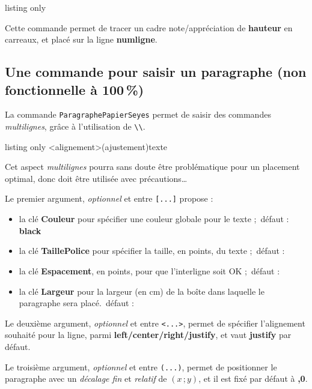 \documentclass[a4paper]{article}
\newcommand\Cle[1]{{\bfseries\sffamily\textlangle #1\textrangle}}
\begin{document}
\begin{PresentationCode}{listing only}
\end{PresentationCode}

Cette commande permet de tracer un cadre \textsf{note/appréciation} de \Cle{hauteur} en carreaux, et placé sur la ligne \Cle{numligne}.

\pagebreak

\subsection{Une commande pour saisir un paragraphe (non fonctionnelle à 100\,\%)}

La commande \texttt{ParagraphePapierSeyes} permet de saisir des commandes \textit{multilignes}, grâce à l'utilisation de \texttt{\textbackslash\textbackslash}.

\begin{PresentationCode}{listing only}
\ParagraphePapierSeyes[options]<alignement>(ajustement){texte}
\end{PresentationCode}

\faBomb{} Cet aspect \textit{multilignes} pourra sans doute être problématique pour un placement optimal, donc doit être utilisée avec précautions\ldots

\smallskip

Le premier argument, \textit{optionnel} et entre \texttt{[...]} propose :

\begin{itemize}
	\item la clé \Cle{Couleur} pour spécifier une couleur globale pour le texte ;\hfill~défaut : \Cle{black}
	\item la clé \Cle{TaillePolice} pour spécifier la taille, en points, du texte ;\hfill~défaut : \Cle{1}
	\item la clé \Cle{Espacement}, en points, pour que l'interligne soit OK ;\hfill~défaut : \Cle{22.792}
	\item la clé \Cle{Largeur} pour la largeur (en cm) de la boîte dans laquelle le paragraphe sera placé.\hfill~défaut : \Cle{16.8}
\end{itemize}

Le deuxième argument, \textit{optionnel} et entre \texttt{<...>}, permet de spécifier l'alignement souhaité pour la ligne, parmi \Cle{left/center/right/justify}, et vaut \Cle{justify} par défaut.

\smallskip

Le troisième argument, \textit{optionnel} et entre \texttt{(...)}, permet de positionner le paragraphe avec un \textit{décalage fin} et \textit{relatif} de $(x\,;y)$, et il est fixé par défaut à \Cle{0,0}.
\end{document}
